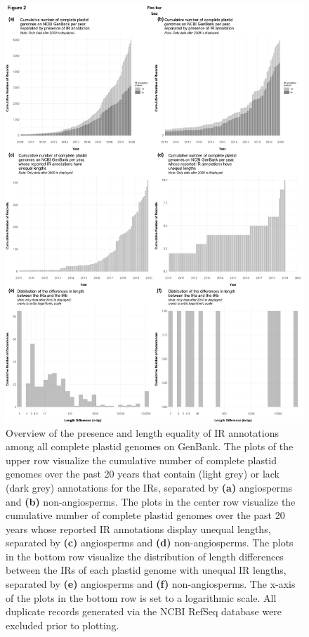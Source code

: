 \documentclass[a4paper,portrait]{article}
\begin{document}
\begin{figure}[!htbp]%
\centering
\includegraphics[width=1.00\linewidth]{input/MANUSCRIPT_Figure2.pdf}
\caption{Overview of the presence and length equality of IR annotations among all complete plastid genomes on GenBank. The plots of the upper row visualize the cumulative number of complete plastid genomes over the past 20 years that contain (light grey) or lack (dark grey) annotations for the IRs, separated by \textbf{(a)} angiosperms and \textbf{(b)} non-angiosperms. The plots in the center row visualize the cumulative number of complete plastid genomes over the past 20 years whose reported IR annotations display unequal lengths, separated by \textbf{(c)} angiosperms and \textbf{(d)} non-angiosperms. The plots in the bottom row visualize the distribution of length differences between the IRs of each plastid genome with unequal IR lengths, separated by \textbf{(e)} angiosperms and \textbf{(f)} non-angiosperms. The x-axis of the plots in the bottom row is set to a logarithmic scale. All duplicate records generated via the NCBI RefSeq database were excluded prior to plotting.}
\label{fig:Figure2}
\end{figure}
\end{document}
